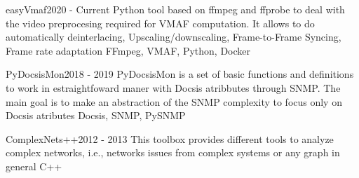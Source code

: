 %
%
%


\begin{projects}
	\project
	{easyVmaf}{2020 - Current}
	{}
	{Python tool based on ffmpeg and ffprobe to deal with the video preprocesing required for VMAF computation. It allows to do automatically deinterlacing, Upscaling/downscaling, Frame-to-Frame Syncing, Frame rate adaptation}
	{FFmpeg, VMAF, Python, Docker}
	
	\project
	{PyDocsisMon}{2018 - 2019}
	{}
	{PyDocsisMon is a set of basic functions and definitions to work in estraightfoward maner with Docsis atribbutes through SNMP. The main goal is to make an abstraction of the SNMP complexity to focus only on Docsis atributes}
	{Docsis, SNMP, PySNMP}


	\project
	{ComplexNets++}{2012 - 2013}
	{}
	{This toolbox provides different tools to analyze complex networks, i.e., networks issues from complex systems or any graph in general}
	{C++}

\end{projects}

